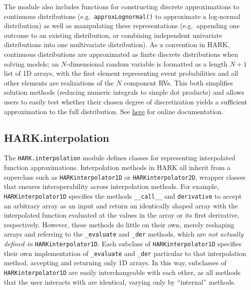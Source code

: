 \documentclass[12pt,titlepage,letterpaper]{econtex}
\begin{document}
{The module also includes functions for constructing discrete approximations to continuous distributions (e.g.\ \texttt{approxLognormal()} to approximate a log-normal distribution) as well as manipulating these representations (e.g.\ appending one outcome to an existing distribution, or combining independent univariate distributions into one multivariate distribution).  As a convention in HARK, continuous distributions are approximated as finite discrete distributions when solving models; an $N$-dimensional random variable is formatted as a length $N+1$ list of 1D arrays, with the first element representing event probabilities and all other elements are realizations of the $N$ component RVs.  This both simplifies solution methods (reducing numeric integrals to simple dot products) and allows users to easily test whether their chosen degree of discretization yields a sufficient approximation to the full distribution.  See \href{https://econ-ark.github.io/HARK/generated/HARK.utilities.html}{here} for online documentation.

\subsection{HARK.interpolation}\label{sec:HARKinterpolation}

The \texttt{HARK.interpolation} module defines classes for representing interpolated function approximations.  Interpolation methods in HARK all inherit from a superclass such as \texttt{HARKinterpolator1D} or \texttt{HARKinterpolator2D}, wrapper classes that ensures interoperability across interpolation methods.  For example, \texttt{HARKinterpolator1D} specifies the methods \texttt{\_\_call\_\_} and \texttt{derivative} to accept an arbitrary array as an input and return an identically shaped array with the interpolated function evaluated at the values in the array or its first derivative, respectively.  However, these methods do little on their own, merely reshaping arrays and referring to the \texttt{\_evaluate} and \texttt{\_der} methods, which are \textit{not actually defined in} \texttt{HARKinterpolator1D}.  Each subclass of \texttt{HARKinterpolator1D} specifies their own implementation of \texttt{\_evaluate} and \texttt{\_der} particular to that interpolation method, accepting and returning only 1D arrays.  In this way, subclasses of \texttt{HARKinterpolator1D} are easily interchangeable with each other, as all methods that the user interacts with are identical, varying only by ``internal'' methods.

}
\end{document}
